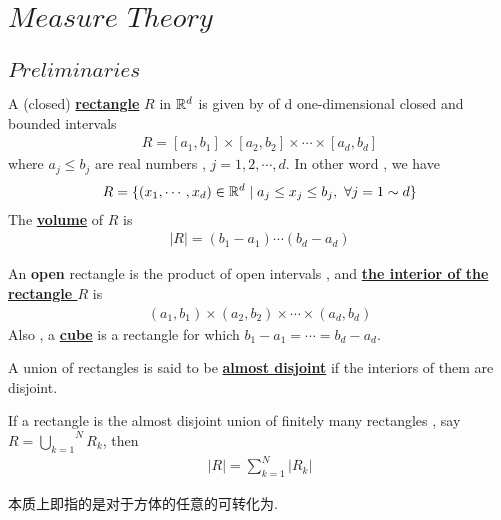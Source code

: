 \ifx\allfiles\undefined


	\else
	\fi
\chapter{$Measure \,\, Theory$}
\section{$Preliminaries$}
	\begin{defn}\label{def 1.1.1}
		A (closed) \underline{\textbf{rectangle}} $R$ in $\mathbb{R}^d$ is given by of d one-dimensional closed and bounded intervals
		\begin{align}
			R = [a_1 , b_1] \times [a_2 , b_2] \times \cdots \times [a_d , b_d]
		\end{align}
		where $a_j \leq b_j$ are real numbers , $j = 1 , 2 , \cdots , d$. In other word , we have
		\begin{align}
			R = \{ (x_1 , \cdots , x_d) \in \mathbb{R}^d \mid a_j \leq x_j \leq b_j , \,\, \forall j = 1 \sim d \}
		\end{align}
		The \underline{\textbf{volume}} of $R$ is
		\begin{align}
			\left| R \right| = (b_1 - a_1)\cdots(b_d - a_d)
		\end{align}
	\end{defn}

	\vspace*{3em}
	An \textbf{open} rectangle is the product of open intervals , and \underline{\textbf{the interior of the rectangle $R$}} is
	\begin{align}
		(a_1 , b_1) \times (a_2 , b_2) \times \cdots \times (a_d , b_d)
	\end{align}
	Also , a \underline{\textbf{cube}} is a rectangle for which $b_1 - a_1 = \cdots = b_d - a_d$.
	
	\vspace*{3em}
	\begin{defn}\label{def 1.1.2}
		A union of rectangles is said to be \underline{\textbf{almost disjoint}} if the interiors of them are disjoint.
	\end{defn}

	\vspace*{3em}
	\begin{lemma}\label{lemma 1.1.1}
		If a rectangle is the almost disjoint union of finitely many rectangles , say $R = \overset{N}{\underset{k = 1}{\bigcup}}{R_k}$, then
		\begin{align}
			\left| R \right| = \sum_{k = 1}^{N}{\left| R_k \right|}
		\end{align}
	
		\begin{rmk}
			本质上即指的是对于方体的任意的可转化为.
		\end{rmk}
	\end{lemma}

